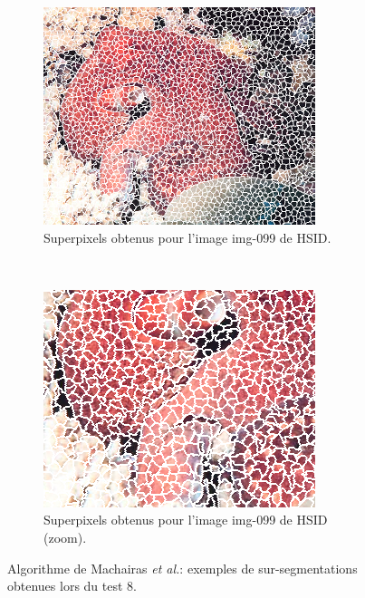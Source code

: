 \begin{figure}[b]
\begin{subfigure}[t]{0.45\textwidth}
			\includegraphics[width=\textwidth]{images/sur-segmentation/WP/EX2-img-099}
		 	\caption{Superpixels obtenus pour l'image img-099 de HSID.}
	\end{subfigure}
	~
	 \begin{subfigure}[t]{0.45\textwidth}	
			\includegraphics[width=\textwidth]{images/sur-segmentation/WP/EX2-img-099-Zoom}
		 	\caption{Superpixels obtenus pour l'image img-099 de HSID (zoom).}
	\end{subfigure}
	\caption{Algorithme de Machairas \textit{et al.}: exemples de sur-segmentations obtenues lors du test 8.}
	\label{fig:sp:exwp1}
\end{figure}

